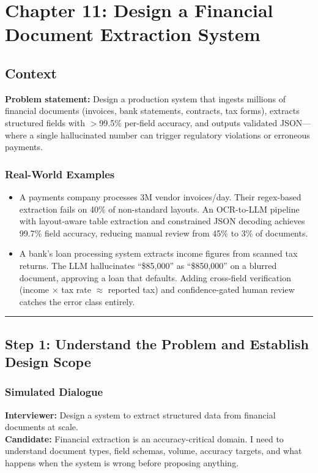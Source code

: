 \chapter{Chapter 11: Design a Financial Document Extraction System}

\section*{Context}

\textbf{Problem statement:} Design a production system that ingests millions of financial documents (invoices, bank statements, contracts, tax forms), extracts structured fields with $>$99.5\% per-field accuracy, and outputs validated JSON---where a single hallucinated number can trigger regulatory violations or erroneous payments.

\subsection*{Real-World Examples}

\begin{itemize}
  \item A payments company processes 3M vendor invoices/day. Their regex-based extraction fails on 40\% of non-standard layouts. An OCR-to-LLM pipeline with layout-aware table extraction and constrained JSON decoding achieves 99.7\% field accuracy, reducing manual review from 45\% to 3\% of documents.
  \item A bank's loan processing system extracts income figures from scanned tax returns. The LLM hallucinates ``\$85,000'' as ``\$850,000'' on a blurred document, approving a loan that defaults. Adding cross-field verification (income $\times$ tax rate $\approx$ reported tax) and confidence-gated human review catches the error class entirely.
\end{itemize}

\bigskip\hrule\bigskip

\section*{Step 1: Understand the Problem and Establish Design Scope}

\subsection*{Simulated Dialogue}

\textbf{Interviewer:} Design a system to extract structured data from financial documents at scale.\\
\textbf{Candidate:} Financial extraction is an accuracy-critical domain. I need to understand document types, field schemas, volume, accuracy targets, and what happens when the system is wrong before proposing anything.

